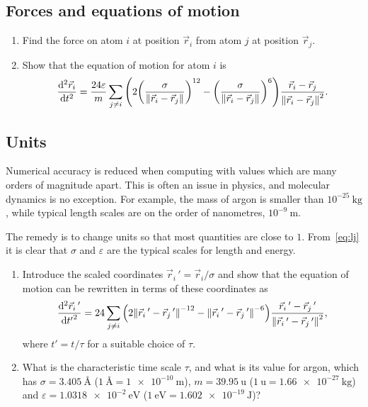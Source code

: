 \documentclass[11pt,english,a4paper]{report}
\begin{document}
\subsection{Forces and equations of motion}
\begin{enumerate}[label=\roman*.]
    \item Find the force on atom \(i\) at position \(\vec{r}_i\) from atom \(j\) at position \(\vec{r}_j\).
    \item Show that the equation of motion for atom \(i\) is
    \begin{equation}
        \dv[2]{\vec{r}_i}{t} = \frac{24\varepsilon}{m} \sum_{j \neq i} \qty(2\qty(\frac{\sigma}{\norm{\vec{r}_i-\vec{r}_j}})^{12}-\qty(\frac{\sigma}{\norm{\vec{r}_i-\vec{r}_j}})^6)\frac{\vec{r}_i-\vec{r}_j}{\norm{\vec{r}_i-\vec{r}_j}^2}.
    \end{equation}
\end{enumerate}

\subsection{Units}
Numerical accuracy is reduced when computing with values which are many orders of magnitude apart. This is often an issue in physics, and molecular dynamics is no exception. For example, the mass of argon is smaller than \(10^{-25}\ \si{\kg}\), while typical length scales are on the order of nanometres, \(10^{-9}\ \si{\m}\).

The remedy is to change units so that most quantities are close to \(1\). From~\vref{eq:lj} it is clear that \(\sigma\) and \(\varepsilon\) are the typical scales for length and energy.

\begin{enumerate}[label=\roman*.]
    \item Introduce the scaled coordinates \(\vec{r}_i\,'=\vec{r}_i/\sigma\) and show that the equation of motion can be rewritten in terms of these coordinates as
    \begin{equation}
        \dv[2]{\vec{r}_i\,'}{{t'}} = 24 \sum_{j \neq i} \qty(2\norm{\vec{r}_i\,'-\vec{r}_j\,'}^{-12}-\norm{\vec{r}_i\,'-\vec{r}_j\,'}^{-6})\frac{\vec{r}_i\,'-\vec{r}_j\,'}{\norm{\vec{r}_i\,'-\vec{r}_j\,'}^2},\label{eq:undim}
    \end{equation}
    where \(t'=t/\tau\) for a suitable choice of \(\tau\).
    \item What is the characteristic time scale \(\tau\), and what is its value for argon, which has \(\sigma=\SI{3.405}{\angstrom}\) (\(\SI{1}{\angstrom}=\SI{1e-10}{\m}\)), \(m = \SI{39.95}{\atomicmassunit}\) (\(\SI{1}{\atomicmassunit} = \SI{1.66e-27}{\kg}\)) and \(\varepsilon=\SI{1.0318e-2}{\eV}\) (\(\SI{1}{\eV}=\SI{1.602e-19}{\J}\))?
\end{enumerate}
\end{document}
